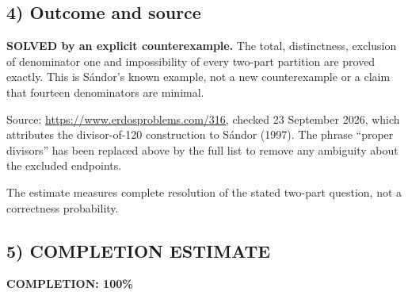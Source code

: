 \subsection*{4) Outcome and source}
\textbf{SOLVED by an explicit counterexample.} The total, distinctness, exclusion of denominator one and impossibility of every two-part partition are proved exactly. This is S\'andor's known example, not a new counterexample or a claim that fourteen denominators are minimal.

Source: \url{https://www.erdosproblems.com/316}, checked 23 September 2026, which attributes the divisor-of-120 construction to S\'andor (1997). The phrase ``proper divisors'' has been replaced above by the full list to remove any ambiguity about the excluded endpoints.

The estimate measures complete resolution of the stated two-part question, not a correctness probability.
\subsection*{5) COMPLETION ESTIMATE}
\textbf{COMPLETION: 100\%}
